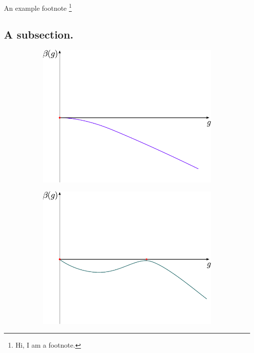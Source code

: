 An example footnote \footnote{Hi, I am a footnote.}
\subsection{A subsection.}









\begin{figure}[htb]
	\center
	\begin{subfigure}[b]{0.4\textwidth}
		\center
		\includegraphics[width=\textwidth]{beta-confining.pdf}
	\end{subfigure}
	\qquad
	\begin{subfigure}[b]{0.4\textwidth}
		\center
		\includegraphics[width=\textwidth]{beta-nearconformal.pdf}
		\label{fig:beta-nearconformal}
	\end{subfigure}



\end{figure}
